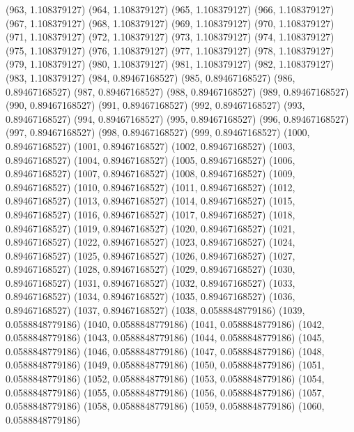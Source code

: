 {					(963, 1.108379127)
					(964, 1.108379127)
					(965, 1.108379127)
					(966, 1.108379127)
					(967, 1.108379127)
					(968, 1.108379127)
					(969, 1.108379127)
					(970, 1.108379127)
					(971, 1.108379127)
					(972, 1.108379127)
					(973, 1.108379127)
					(974, 1.108379127)
					(975, 1.108379127)
					(976, 1.108379127)
					(977, 1.108379127)
					(978, 1.108379127)
					(979, 1.108379127)
					(980, 1.108379127)
					(981, 1.108379127)
					(982, 1.108379127)
					(983, 1.108379127)
					(984, 0.89467168527)
					(985, 0.89467168527)
					(986, 0.89467168527)
					(987, 0.89467168527)
					(988, 0.89467168527)
					(989, 0.89467168527)
					(990, 0.89467168527)
					(991, 0.89467168527)
					(992, 0.89467168527)
					(993, 0.89467168527)
					(994, 0.89467168527)
					(995, 0.89467168527)
					(996, 0.89467168527)
					(997, 0.89467168527)
					(998, 0.89467168527)
					(999, 0.89467168527)
					(1000, 0.89467168527)
					(1001, 0.89467168527)
					(1002, 0.89467168527)
					(1003, 0.89467168527)
					(1004, 0.89467168527)
					(1005, 0.89467168527)
					(1006, 0.89467168527)
					(1007, 0.89467168527)
					(1008, 0.89467168527)
					(1009, 0.89467168527)
					(1010, 0.89467168527)
					(1011, 0.89467168527)
					(1012, 0.89467168527)
					(1013, 0.89467168527)
					(1014, 0.89467168527)
					(1015, 0.89467168527)
					(1016, 0.89467168527)
					(1017, 0.89467168527)
					(1018, 0.89467168527)
					(1019, 0.89467168527)
					(1020, 0.89467168527)
					(1021, 0.89467168527)
					(1022, 0.89467168527)
					(1023, 0.89467168527)
					(1024, 0.89467168527)
					(1025, 0.89467168527)
					(1026, 0.89467168527)
					(1027, 0.89467168527)
					(1028, 0.89467168527)
					(1029, 0.89467168527)
					(1030, 0.89467168527)
					(1031, 0.89467168527)
					(1032, 0.89467168527)
					(1033, 0.89467168527)
					(1034, 0.89467168527)
					(1035, 0.89467168527)
					(1036, 0.89467168527)
					(1037, 0.89467168527)
					(1038, 0.0588848779186)
					(1039, 0.0588848779186)
					(1040, 0.0588848779186)
					(1041, 0.0588848779186)
					(1042, 0.0588848779186)
					(1043, 0.0588848779186)
					(1044, 0.0588848779186)
					(1045, 0.0588848779186)
					(1046, 0.0588848779186)
					(1047, 0.0588848779186)
					(1048, 0.0588848779186)
					(1049, 0.0588848779186)
					(1050, 0.0588848779186)
					(1051, 0.0588848779186)
					(1052, 0.0588848779186)
					(1053, 0.0588848779186)
					(1054, 0.0588848779186)
					(1055, 0.0588848779186)
					(1056, 0.0588848779186)
					(1057, 0.0588848779186)
					(1058, 0.0588848779186)
					(1059, 0.0588848779186)
					(1060, 0.0588848779186)
}
